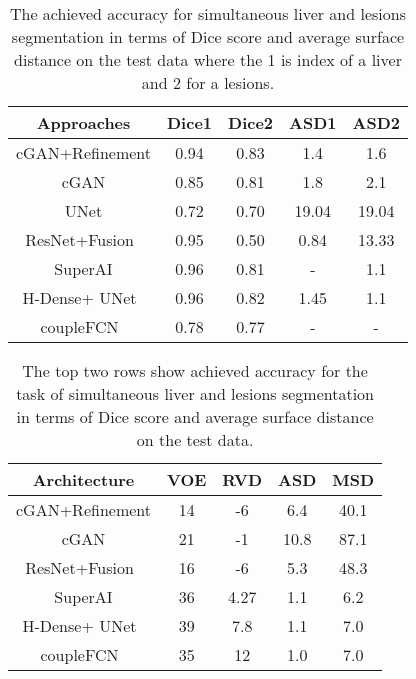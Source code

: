 \documentclass[10pt,twocolumn,letterpaper]{article}
\begin{document}
\begin{table}[!htbp]
\centering
\caption{The achieved accuracy for simultaneous liver and lesions segmentation in terms of Dice score and average surface distance on the test data where the 1 is index of a liver and 2 for a lesions.}
\begin{tabular}{*5c}
\toprule
Approaches & Dice1  & Dice2 & ASD1 & ASD2 \\
\midrule
cGAN+Refinement   &  0.94 & 0.83  & 1.4 & 1.6 \\
cGAN   &  0.85 & 0.81  & 1.8  &  2.1  \\
UNet   &  0.72 & 0.70  & 19.04  &  19.04    \\
ResNet+Fusion~\cite{BiKKF17} & 0.95 & 0.50  & 0.84 &  13.33  \\
SuperAI & 0.96  & 0.81  & -  &  1.1   \\
H-Dense+ UNet~\cite{Han17a} &  0.96 & 0.82  & 1.45  & 1.1    \\
coupleFCN~\cite{VorontsovCTPK17} &  0.78 & 0.77  & -  &  -    \\
\bottomrule
\end{tabular}
\label{dice_asd_liver}
\end{table}\begin{table}[!htbp]
\centering
\caption{The top two rows show achieved accuracy for the task of simultaneous liver and lesions segmentation in terms of Dice score and average surface distance on the test data.}
\begin{tabular}{*5c}
\toprule
Architecture & VOE  & RVD & ASD & MSD \\
\midrule
cGAN+Refinement   &  14 & -6  & 6.4 & 40.1 \\
cGAN   &  21 & -1  & 10.8  &  87.1  \\
ResNet+Fusion~\cite{BiKKF17} & 16 & -6  & 5.3 &  48.3 \\
SuperAI & 36 & 4.27  & 1.1 &  6.2 \\
H-Dense+ UNet~\cite{Han17a} &  39 & 7.8  & 1.1 &  7.0 \\
coupleFCN~\cite{VorontsovCTPK17} & 35 & 12  & 1.0 &  7.0 \\
\bottomrule
\end{tabular}
\label{ourmertricliver}
\end{table}
\end{document}
